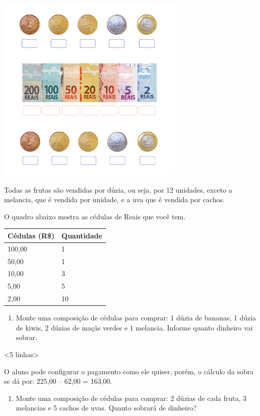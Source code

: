 \includegraphics[width=3.55208in,height=3.57292in]{media/image71.png}

Todas as frutas são vendidas por dúzia, ou seja, por 12 unidades, exceto
a melancia, que é vendida por unidade, e a uva que é vendida por cachos.

O quadro abaixo mostra as cédulas de Reais que você tem.

\begin{longtable}[]{@{}ll@{}}
\toprule
Cédulas (R\$) & Quantidade\tabularnewline
\midrule
\endhead
100,00 & 1\tabularnewline
50,00 & 1\tabularnewline
10,00 & 3\tabularnewline
5,00 & 5\tabularnewline
2,00 & 10\tabularnewline
\bottomrule
\end{longtable}

\begin{enumerate}
\def\labelenumi{\alph{enumi})}
\item
  Monte uma composição de cédulas para comprar: 1 dúzia de bananas, 1
  dúzia de kiwis, 2 dúzias de maçãs verdes e 1 melancia. Informe quanto
  dinheiro vai sobrar.
\end{enumerate}

\textless{}5 linhas\textgreater{}

O aluno pode configurar o pagamento como ele quiser, porém, o cálculo da
sobra se dá por: 225,00 -- 62,00 = 163,00.

\begin{enumerate}
\def\labelenumi{\alph{enumi})}
\item
  Monte uma composição de cédulas para comprar: 2 dúzias de cada fruta,
  3 melancias e 5 cachos de uvas. Quanto sobrará de dinheiro?
\end{enumerate}


